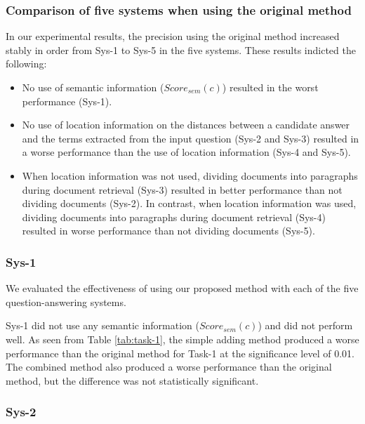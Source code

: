 \subsubsection{Comparison of five systems when using the original method}
\label{sec:comparison_five_systems}

In our experimental results, 
the precision using the original method increased stably 
in order from Sys-1 to Sys-5 in the five systems. 
These results indicted the following:
\begin{itemize}
\item 
  No use of semantic information ($Score_{sem}(c)$) resulted in the worst performance (Sys-1). 

\item 
  No use of location information 
  on the distances between a candidate answer 
  and the terms extracted from the input question (Sys-2 and Sys-3) 
  resulted in a worse performance than the use of location information (Sys-4 and Sys-5). 

\item 
  When location information was not used, 
  dividing documents into paragraphs during document retrieval (Sys-3)
  resulted in better performance than not dividing documents (Sys-2). 
  In contrast, 
  when location information was used, 
  dividing documents into paragraphs during document retrieval (Sys-4)
  resulted in worse performance than not dividing documents (Sys-5). 
\end{itemize}

\subsubsection{Sys-1}

We evaluated the effectiveness of using our proposed method
with each of the five question-answering systems. 

Sys-1 did not use any semantic information ($Score_{sem}(c)$) and 
did not perform well. 
As seen from Table \ref{tab:task-1}, 
the simple adding method produced a worse performance 
than the original method for Task-1 at the significance level of 0.01. 
The combined method also produced a worse performance 
than the original method, 
but the difference was not statistically significant. 

\subsubsection{Sys-2}

